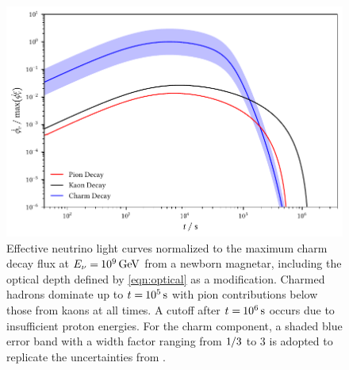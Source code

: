 \begin{figure}[H]
	\centering
	\includegraphics{../plots/build/magnetar_neutrino_spectrum_with.pdf}
	\caption[Magnetar $\nu \kern+0.5pt$ flux compared to $c$ decay with optical depth.]
			{Effective neutrino light curves normalized to the maximum charm decay flux at
			 $E_\nu = \kern-0.5pt \qty{e9}{\giga\electronvolt}$ from a newborn magnetar, including the optical depth
			 defined by \eqref{eqn:optical} as a modification. Charmed hadrons dominate up to $t = \kern-0.5pt \qty{e5}{\second}$
			 with pion contributions below those from kaons at all times. A cutoff after $t = \kern-0.5pt \qty{e6}{\second}$ occurs
			 due to insufficient proton energies. For the charm component, a shaded blue error band with a width factor ranging from
			 $1 \kern-0.5pt /3$ to $3$ is adopted to replicate the uncertainties from \cite{Carpio_2020}.}
	\label{fig:magnetar-flux-with}
\end{figure}

